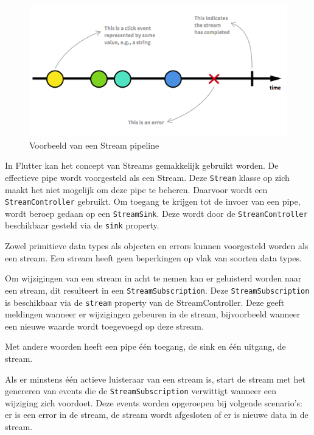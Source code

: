 \begin{figure}[H]
    \centering
    \includegraphics[width=\figureWidthModifier\linewidth]{img/stand-van-zaken/stream-pipeline.png}
    \caption{Voorbeeld van een Stream pipeline \autocite{Staltz2019}} 
    \label{fig:stream-pipeline}
\end{figure}

In Flutter kan het concept van Streams gemakkelijk gebruikt worden. De effectieve pipe wordt voorgesteld als een Stream. Deze \verb|Stream| klasse op zich maakt het niet mogelijk om deze pipe te beheren.
Daarvoor wordt een \verb|StreamController| gebruikt. Om toegang te krijgen tot de invoer van een pipe, wordt beroep gedaan op een \verb|StreamSink|. Deze wordt door de \verb|StreamController| beschikbaar gesteld via de \verb|sink| property.

Zowel primitieve data types als objecten en errors kunnen voorgesteld worden als een stream. Een stream heeft geen beperkingen op vlak van soorten data types.

Om wijzigingen van een stream in acht te nemen kan er geluisterd worden naar een stream, dit resulteert in een \verb|StreamSubscription|. Deze \verb|StreamSubscription| is beschikbaar via de \verb|stream| property van de StreamController. Deze geeft meldingen wanneer er wijzigingen gebeuren in de stream, bijvoorbeeld wanneer een nieuwe waarde wordt toegevoegd op deze stream.

Met andere woorden heeft een pipe één toegang, de sink en één uitgang, de stream.

Als er minstens één actieve luisteraar van een stream is, start de stream met het genereren van events die de \verb|StreamSubscription| verwittigt wanneer een wijziging zich voordoet. Deze events worden opgeroepen bij volgende scenario's: er is een error in de stream, de stream wordt afgesloten of er is nieuwe data in de stream.

